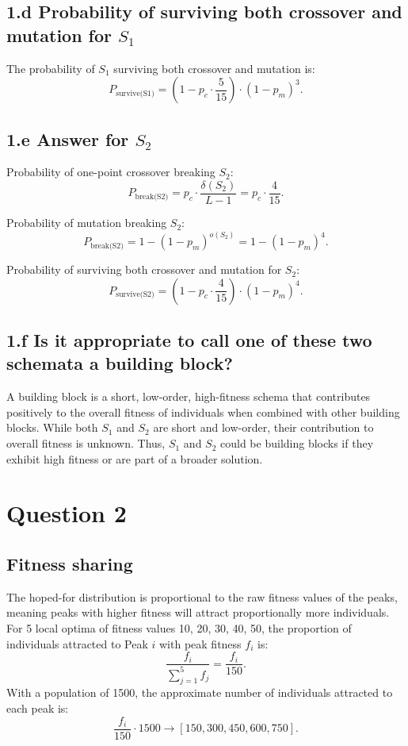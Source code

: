 \documentclass[12pt,letterpaper]{article}
\begin{document}
\subsection*{1.d Probability of surviving both crossover and mutation for \( S_1 \)}
The probability of \( S_1 \) surviving both crossover and mutation is:
\[
P_{\text{survive(S1)}} = \left( 1 - p_c \cdot \frac{5}{15} \right) \cdot (1 - p_m)^3.
\]

\subsection*{1.e Answer for \( S_2 \)}
Probability of one-point crossover breaking \( S_2 \):
\[
P_{\text{break(S2)}} = p_c \cdot \frac{\delta(S_2)}{L - 1} = p_c \cdot \frac{4}{15}.
\]

Probability of mutation breaking \( S_2 \):
\[
P_{\text{break(S2)}} = 1 - (1 - p_m)^{o(S_2)} = 1 - (1 - p_m)^4.
\]

Probability of surviving both crossover and mutation for \( S_2 \):
\[
P_{\text{survive(S2)}} = \left( 1 - p_c \cdot \frac{4}{15} \right) \cdot (1 - p_m)^4.
\]

\subsection*{1.f Is it appropriate to call one of these two schemata a building block?}
A building block is a short, low-order, high-fitness schema that contributes positively to the overall fitness of individuals when combined with other building blocks.
While both \( S_1 \) and \( S_2 \) are short and low-order, their contribution to overall fitness is unknown.
Thus, \( S_1 \) and \( S_2 \) could be building blocks if they exhibit high fitness or are part of a broader solution.

\section*{Question 2}
\subsection*{Fitness sharing}
The hoped-for distribution is proportional to the raw fitness values of the peaks, meaning peaks with higher fitness will attract proportionally more individuals.
For 5 local optima of fitness values 10, 20, 30, 40, 50, the proportion of individuals attracted to Peak \( i \) with peak fitness \( f_i \) is:
\[
\frac{f_i}{\sum_{j=1}^{5} f_j} = \frac{f_i}{150}.
\]
With a population of 1500, the approximate number of individuals attracted to each peak is:
\[
\frac{f_i}{150} \cdot 1500 \rightarrow \left[150, 300, 450, 600, 750\right].
\]
\end{document}
